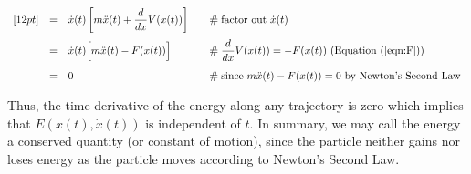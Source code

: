 \begin{theorem}
\begin{equation*}
\begin{array}{llll}
[12pt]
&=& \dot{x}(t)\left [m \ddot{x}(t) + \dfrac{d}{dx}V(x(t)) \right ]
		&\hspace{1em} \mathrel{\#} \text{factor out $\dot{x}(t)$} \\
[12pt]
&=& \dot{x}(t)\Big [m \ddot{x}(t) - F(x(t)) \Big ]
		&\hspace{1em} \mathrel{\#} \text{$\dfrac{d}{dx}V(x(t)) = - F(x(t))$ 
		                                 (Equation (\ref{eqn:F}))} \\
[12pt]
&=& 0
		&\hspace{1em} \mathrel{\#} \text{since $m \ddot{x}(t) - F(x(t)) = 0$ 
		                                 by Newton's Second Law}
\end{array}
\end{equation*}

\bigskip
\noindent
Thus, the time derivative of the energy along any trajectory is zero which implies that
$E(x(t), \dot{x}(t))$ is independent of $t$. In summary, we may call the energy a conserved 
quantity (or constant of motion), since the particle neither gains nor loses energy as the 
particle moves according to Newton’s Second Law.
\end{theorem}

